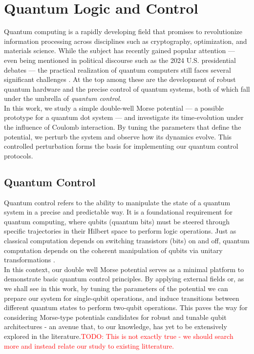 \documentclass{subfiles}
\begin{document}
\section{Quantum Logic and Control}
Quantum computing is a rapidly developing field that promises to revolutionize information processing across disciplines such as cryptography, optimization, and materials science. While the subject has recently gained popular attention — even being mentioned in political discourse such as the 2024 U.S. presidential debates — the practical realization of quantum computers still faces several significant challenges \cite{lau2022nisq}. At the top among these are the development of robust quantum hardware and the precise control of quantum systems, both of which fall under the umbrella of \emph{quantum control}\cite{huang1983controllability, d2021introduction}. \\ 

In this work, we study a simple double-well Morse potential — a possible prototype for a quantum dot system — and investigate its time-evolution under the influence of Coulomb interaction. By tuning the parameters that define the potential, we perturb the system and observe how its dynamics evolve. This controlled perturbation forms the basis for implementing our quantum control protocols.
\subsection{Quantum Control}
Quantum control refers to the ability to manipulate the state of a quantum system in a precise and predictable way. It is a foundational requirement for quantum computing, where qubits (quantum bits) must be steered through specific trajectories in their Hilbert space to perform logic operations. Just as classical computation depends on switching transistors (bits) on and off, quantum computation depends on the coherent manipulation of qubits via unitary transformations \cite{nielsen2010quantum}. \\ 
In this context, our double well Morse potential serves as a minimal platform to demonstrate basic quantum control principles. By applying external fields or, as we shall see in this work, by tuning the parameters of the potential we can prepare our system for single-qubit operations, and induce transitions between different quantum states to perform two-qubit operations. This paves the way for considering Morse-type potentials candidates for robust and tunable qubit architectures - an avenue that, to our knowledge, has yet to be extensively explored in the literature.\textcolor{red}{TODO: This is not exactly true - we should search more and instead relate our study to existing litterature.} \\ 
\end{document}
